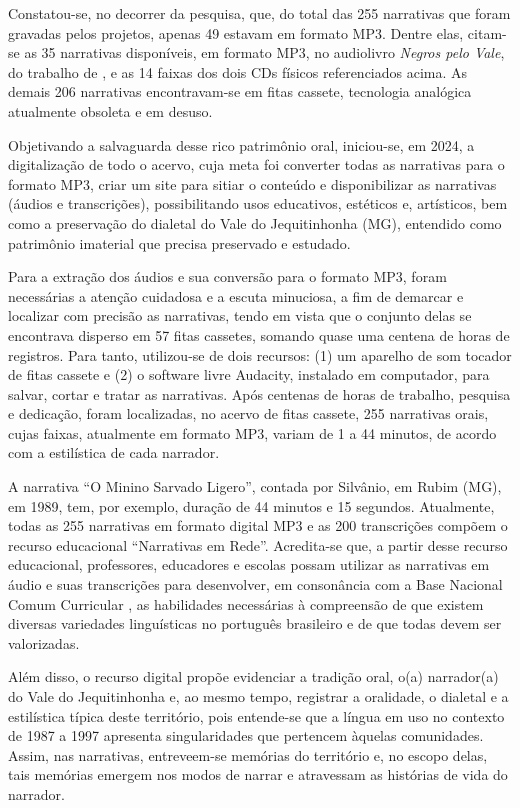 \documentclass[portuguese]{textolivre}
\begin{document}
Constatou-se, no decorrer da pesquisa, que, do total das 255 narrativas que foram gravadas pelos projetos, apenas 49 estavam em formato MP3. Dentre elas, citam-se as 35 narrativas disponíveis, em formato MP3, no audiolivro \textit{Negros pelo Vale}, do trabalho de \textcite{Souza2014}, e as 14 faixas dos dois CDs físicos referenciados acima. As demais 206 narrativas encontravam-se em fitas cassete, tecnologia analógica atualmente obsoleta e em desuso.

Objetivando a salvaguarda desse rico patrimônio oral, iniciou-se, em 2024, a digitalização de todo o acervo, cuja meta foi converter todas as narrativas para o formato MP3, criar um site para sitiar o conteúdo e disponibilizar as narrativas (áudios e transcrições), possibilitando usos educativos, estéticos e, artísticos, bem como a preservação do dialetal do Vale do Jequitinhonha (MG), entendido como patrimônio imaterial que precisa preservado e estudado.

Para a extração dos áudios e sua conversão para o formato MP3, foram necessárias a atenção cuidadosa e a escuta minuciosa, a fim de demarcar e localizar com precisão as narrativas, tendo em vista que o conjunto delas se encontrava disperso em 57 fitas cassetes, somando quase uma centena de horas de registros. Para tanto, utilizou-se de dois recursos: (1) um aparelho de som tocador de fitas cassete e (2) o software livre Audacity, instalado em computador, para salvar, cortar e tratar as narrativas. Após centenas de horas de trabalho, pesquisa e dedicação, foram localizadas, no acervo de fitas cassete, 255 narrativas orais, cujas faixas, atualmente em formato MP3, variam de 1 a 44 minutos, de acordo com a estilística de cada narrador.

A narrativa “O Minino Sarvado Ligero”, contada por Silvânio, em Rubim (MG), em 1989, tem, por exemplo, duração de 44 minutos e 15 segundos. Atualmente, todas as 255 narrativas em formato digital MP3 e as 200 transcrições compõem o recurso educacional “Narrativas em Rede”.	Acredita-se que, a partir desse recurso educacional, professores, educadores e escolas possam utilizar as narrativas em áudio e suas transcrições para desenvolver, em consonância com a Base Nacional Comum Curricular \cite{BrasilMEC2018}, as habilidades necessárias à compreensão de que existem diversas variedades linguísticas no português brasileiro e de que todas devem ser valorizadas.

Além disso, o recurso digital propõe evidenciar a tradição oral, o(a) narrador(a) do Vale do Jequitinhonha e, ao mesmo tempo, registrar a oralidade, o dialetal e a estilística típica deste território, pois entende-se que a língua em uso no contexto de 1987 a 1997 apresenta singularidades que pertencem àquelas comunidades. Assim, nas narrativas, entreveem-se memórias do território e, no escopo delas, tais memórias emergem nos modos de narrar e atravessam as histórias de vida do narrador.
\end{document}

